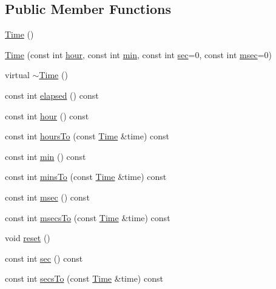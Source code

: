 \subsection*{Public Member Functions}
\begin{DoxyCompactItemize}
\item 
\hyperlink{classprism_1_1_time_a9cb33724bd39863cec83613c089d6f12}{Time} ()
\item 
\hyperlink{classprism_1_1_time_acdee4966daaf75f9b735744881481372}{Time} (const int \hyperlink{classprism_1_1_time_a380242e03982df8bf4af3eaa2296c808}{hour}, const int \hyperlink{classprism_1_1_time_afd27e4b1e093fed8253b10090c6090aa}{min}, const int \hyperlink{classprism_1_1_time_a83f655a9c7f1a2e8521ddcb395fa3796}{sec}=0, const int \hyperlink{classprism_1_1_time_a203ccb36ae3f75991b641e282350b280}{msec}=0)
\item 
virtual \hyperlink{classprism_1_1_time_a70238eb26c90283a833fefc38e994f70}{$\sim$\+Time} ()
\item 
const int \hyperlink{classprism_1_1_time_a786f569b1aae18249916c47d6221ae86}{elapsed} () const 
\item 
const int \hyperlink{classprism_1_1_time_a380242e03982df8bf4af3eaa2296c808}{hour} () const 
\item 
const int \hyperlink{classprism_1_1_time_a759d033f1ef8602118fbe887eb8a2241}{hours\+To} (const \hyperlink{classprism_1_1_time}{Time} \&time) const 
\item 
const int \hyperlink{classprism_1_1_time_afd27e4b1e093fed8253b10090c6090aa}{min} () const 
\item 
const int \hyperlink{classprism_1_1_time_a654fe322a9b2aefe6ec9713bebf67fc7}{mins\+To} (const \hyperlink{classprism_1_1_time}{Time} \&time) const 
\item 
const int \hyperlink{classprism_1_1_time_a203ccb36ae3f75991b641e282350b280}{msec} () const 
\item 
const int \hyperlink{classprism_1_1_time_a91a3b84fe2e96f260ce05a64d44212d6}{msecs\+To} (const \hyperlink{classprism_1_1_time}{Time} \&time) const 
\item 
void \hyperlink{classprism_1_1_time_aff00f53fdc1e7b0eb249b6410d2cde28}{reset} ()
\item 
const int \hyperlink{classprism_1_1_time_a83f655a9c7f1a2e8521ddcb395fa3796}{sec} () const 
\item 
const int \hyperlink{classprism_1_1_time_a06e59e21a308459f3984a9680e431b32}{secs\+To} (const \hyperlink{classprism_1_1_time}{Time} \&time) const 
\item 

\end{DoxyCompactItemize}
